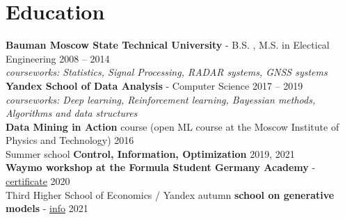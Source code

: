 \section*{\sectionformat Education}
\textbf{Bauman Moscow State Technical University} - B.S. , M.S. in Electical Engineering \hfill 2008 -- 2014 \\
\textit{courseworks: Statistics, Signal Processing, RADAR systems, GNSS systems} \\
% 
\textbf{Yandex School of Data Analysis} - Computer Science \hfill 2017 -- 2019 \\
\textit{courseworks: Deep learning, Reinforcement learning, Bayessian methods, Algorithms and data structures} \\
% 
\textbf{Data Mining in Action} course (open ML course at the Moscow Institute of Physics and Technology) \hfill    2016         \\
% 
Summer school \textbf{Control, Information, Optimization}                                                                                             \hfill  2019, 2021 \\
%
\textbf{Waymo workshop at the Formula Student Germany Academy} - \href{https://drive.google.com/file/d/1-WxECccxBrRWIvEt9WQeXKTueiF658r7/view?usp=sharing}{certificate}   \hfill  2020       \\
% 
Third Higher School of Economics / Yandex autumn \textbf{school on generative models} - \href{https://indico.cern.ch/event/1082512/timetable/#20211123}{info}                  \hfill  2021
\nolinebreak
